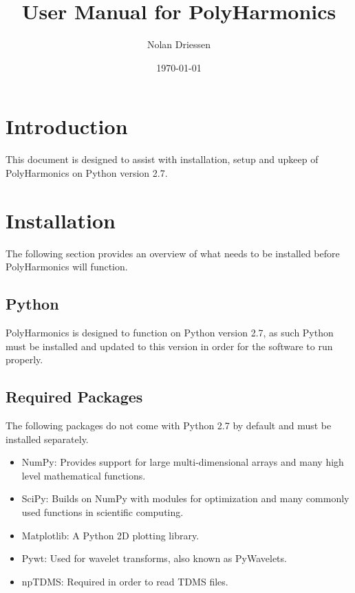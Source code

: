 \documentclass[12pt]{article}
\newcommand{\progname}{PolyHarmonics}
\begin{document}
\title{User Manual for \progname} 
\author{Nolan Driessen}
\date{\today}
	
\maketitle

\tableofcontents

\section{Introduction}

This document is designed to assist with installation, setup and upkeep of 
\progname{} 
on Python version 2.7.


\section{Installation}
The following section provides an overview of what needs to be installed before 
\progname{} will function.

\subsection{Python}
\progname{} is designed to function on Python version 2.7, as such Python must 
be installed and updated to this version in order for the software to run 
properly.
\subsection{Required Packages}
The following packages do not come with Python 2.7 by default and must be 
installed separately.
\begin{itemize}
\item NumPy: Provides support for large multi-dimensional arrays and many high 
level mathematical functions.
\item SciPy: Builds on NumPy with modules for optimization and many commonly 
used functions in scientific computing.
\item Matplotlib: A Python 2D plotting library.
\item Pywt: Used for wavelet transforms, also known as PyWavelets.
\item npTDMS: Required in order to read TDMS files.
\end{itemize}
\end{document}
